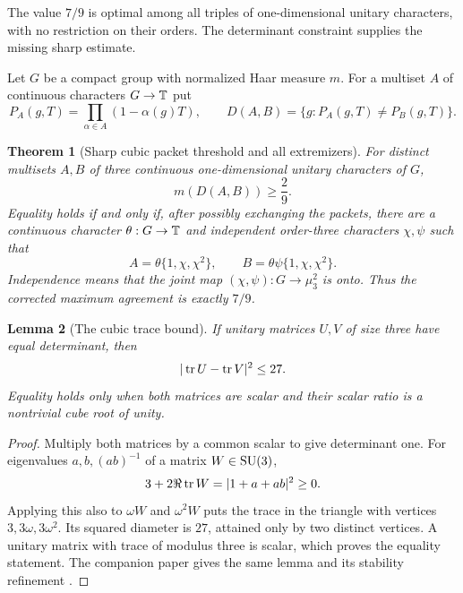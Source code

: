 \documentclass[11pt]{article}
\newtheorem{theorem}{Theorem}[section]
\newtheorem{lemma}[theorem]{Lemma}
\theoremstyle{remark}\newtheorem{remark}[theorem]{Remark}
\begin{document}
The value $7/9$ is optimal among all triples of one-dimensional unitary characters, with no restriction on their orders. The determinant constraint supplies the missing sharp estimate.

Let $G$ be a compact group with normalized Haar measure $m$. For a multiset $A$ of continuous characters $G\to\mathbb T$ put
\[
 P_A(g,T)=\prod_{\alpha\in A}(1-\alpha(g)T),\qquad
 D(A,B)=\{g:P_A(g,T)\ne P_B(g,T)\}.
\]

\begin{theorem}[Sharp cubic packet threshold and all extremizers]\label{thm:abelian}
For distinct multisets $A,B$ of three continuous one-dimensional unitary characters of $G$,
\begin{equation}\label{eq:corrected}
 m(D(A,B))\ge\frac29.
\end{equation}
Equality holds if and only if, after possibly exchanging the packets, there are a continuous character $\theta:G\to\mathbb T$ and independent order-three characters $\chi,\psi$ such that
\begin{equation}\label{eq:all-extremizers}
 A=\theta\{1,\chi,\chi^2\},\qquad
 B=\theta\psi\{1,\chi,\chi^2\}.
\end{equation}
Independence means that the joint map $(\chi,\psi):G\to\mu_3^2$ is onto. Thus the corrected maximum agreement is exactly $7/9$.
\end{theorem}

\begin{lemma}[The cubic trace bound]\label{lem:triangle}
If unitary matrices $U,V$ of size three have equal determinant, then
\[
 |\operatorname{tr} U-\operatorname{tr} V|^2\le27.
\]
Equality holds only when both matrices are scalar and their scalar ratio is a nontrivial cube root of unity.
\end{lemma}

\begin{proof}
Multiply both matrices by a common scalar to give determinant one. For eigenvalues $a,b,(ab)^{-1}$ of a matrix $W\in\mathrm{SU}(3)$,
\[
 3+2\Re\operatorname{tr} W=|1+a+ab|^2\ge0.
\]
Applying this also to $\omega W$ and $\omega^2W$ puts the trace in the triangle with vertices $3,3\omega,3\omega^2$. Its squared diameter is $27$, attained only by two distinct vertices. A unitary matrix with trace of modulus three is scalar, which proves the equality statement. The companion paper gives the same lemma and its stability refinement \cite{Companion}.
\end{proof}
\end{document}
